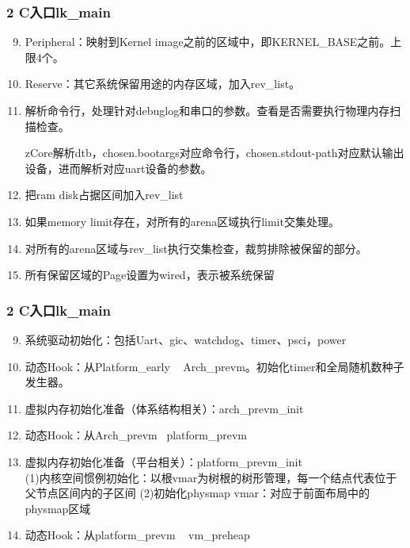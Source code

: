 \documentclass[
8pt, %
]{beamer}
\begin{document}
	\begin{frame}
		\frametitle{2 C入口lk\_main}
		\begin{enumerate}\setcounter{enumi}{8}
			\item Peripheral：映射到Kernel image之前的区域中，即KERNEL\_BASE之前。上限4个。
			\item Reserve：其它系统保留用途的内存区域，加入rev\_list。
			\item 解析命令行，处理针对debuglog和串口的参数。查看是否需要执行物理内存扫描检查。
			\begin{block}{}
				zCore解析dtb，chosen.bootargs对应命令行，chosen.stdout-path对应默认输出设备，进而解析对应uart设备的参数。
			\end{block}
			\item 把ram disk占据区间加入rev\_list
			\item 如果memory limit存在，对所有的arena区域执行limit交集处理。
			\item 对所有的arena区域与rev\_list执行交集检查，裁剪排除被保留的部分。
			\item 所有保留区域的Page设置为wired，表示被系统保留
		\end{enumerate}
	\end{frame}

	\begin{frame}
		\frametitle{2 C入口lk\_main}
		\begin{enumerate}\setcounter{enumi}{8}
			\item 系统驱动初始化：包括Uart、gic、watchdog、timer、psci，power
			\item 动态Hook：从Platform\_early ~ Arch\_prevm。初始化timer和全局随机数种子发生器。
			\item 虚拟内存初始化准备（体系结构相关）：arch\_prevm\_init
			\item 动态Hook：从Arch\_prevm ~platform\_prevm
			\item 虚拟内存初始化准备（平台相关）：platform\_prevm\_init\\
			(1)内核空间惯例初始化：以根vmar为树根的树形管理，每一个结点代表位于父节点区间内的子区间
			(2)初始化physmap vmar：对应于前面布局中的physmap区域
			\item 动态Hook：从platform\_prevm ~ vm\_preheap
		\end{enumerate}
	\end{frame}
\end{document}
